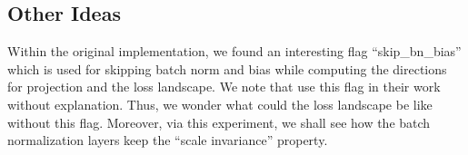 \subsection{Other Ideas}
\label{sec:others}
Within the original implementation, we found an interesting flag ``skip\_bn\_bias'' which is used for skipping batch norm and bias while computing the directions for projection and the loss landscape. 
We note that \cite{li2018visualizing} use this flag in their work without explanation. 
Thus, we wonder what could the loss landscape be like without this flag. 
Moreover, via this experiment, we shall see how the batch normalization layers keep the ``scale invariance'' property. 